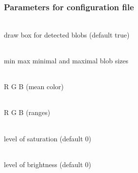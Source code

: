 \subsubsection{Parameters for configuration file}
    \begin{description} \itemindent=-15pt
        \item[box] \hfill \\ draw box for detected blobs (default true)
        \item[area] \hfill \\ min max minimal and maximal blob sizes
        \item[color] \hfill \\ R G B (mean color)
        \item[wide] \hfill \\ R G B (ranges)
        \item[saturation] \hfill \\ level of saturation (default 0)
        \item[brightness] \hfill \\ level of brightness (default 0)
    \end{description}


